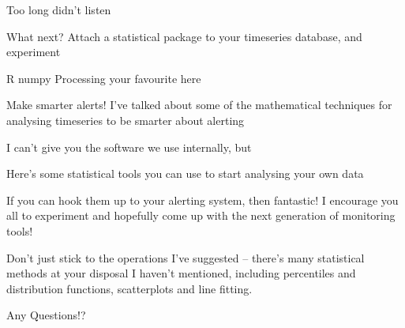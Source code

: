 \documentclass[online,12pt,helvetica]{chaksem}
\begin{document}
Too long didn't listen

What next?
Attach a statistical package to your timeseries database, and experiment

R
numpy
Processing
your favourite here

Make smarter alerts!
I've talked about some of the mathematical techniques for analysing timeseries to be smarter about alerting

I can't give you the software we use internally, but

Here's some statistical tools you can use to start analysing your own data

If you can hook them up to your alerting system, then fantastic!  I encourage you all to experiment and hopefully come up with the next generation of monitoring tools!

Don't just stick to the operations I've suggested -- there's many statistical methods at your disposal I haven't mentioned, including percentiles and distribution functions, scatterplots and line fitting.

Any Questions!?
\end{document}
